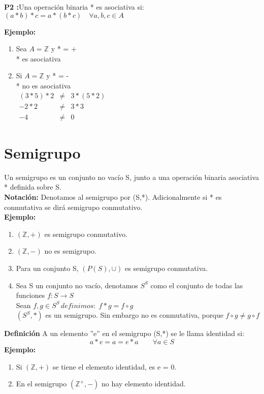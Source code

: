 \textbf{P2 :}Una operación binaria  * es asociativa si:
$(a*b)*c=a*(b*c)\quad \forall a,b,c \in A$

\textbf{Ejemplo: }
\begin{enumerate}
\item Sea $A=\mathds{Z}$ y * = +\\
		* es asociativa
\item Si $A=\mathds{Z}$ y * = -\\
		* no es asociativa\\
		$\begin{array}{rll}		
		(3*5)*2&\not=& 3*(5*2)\\
		-2*2 &\not=& 3*3\\
		-4 &\not=& 0\end{array}$
\end{enumerate}

\section{Semigrupo}

Un semigrupo es un conjunto no vacío S, junto a una operación binaria asociativa * definida sobre S.\\
\textbf{Notación: }Denotamos al semigrupo por (S,*). Adicionalmente si * es conmutativa se dirá semigrupo conmutativo.\\
\textbf{Ejemplo: }
\begin{enumerate}
\item $(\mathds{Z},+)$ es semigrupo conmutativo.
\item $(\mathds{Z},-)$ no es semigrupo.
\item Para un conjunto S, $(P(S), \cup)$ es semigrupo conmutativa.
\item Sea S un conjunto no vacío, denotamos $S^S$ como el conjunto de todas las funciones $f:S\rightarrow S$\\
		Sean $f,g\in S^S \, definimos: \; f*g=f\circ g$\\
		$(S^S,*)$ es un semigrupo. Sin embargo no es conmutativa, porque $f\circ g\not= g\circ f$
\end{enumerate}

\textbf{Definición } A un elemento ''e'' en el semigrupo (S,*) se le llama identidad si: $$a*e=a=e*a\quad\quad \forall a\in S$$
\textbf{Ejemplo: }
\begin{enumerate}
\item Si $(\mathds{Z},+)$ se tiene el elemento identidad, es e = 0.
\item En el semigrupo $(\mathds{Z}^+,-)$ no hay elemento identidad.
\end{enumerate}
		
